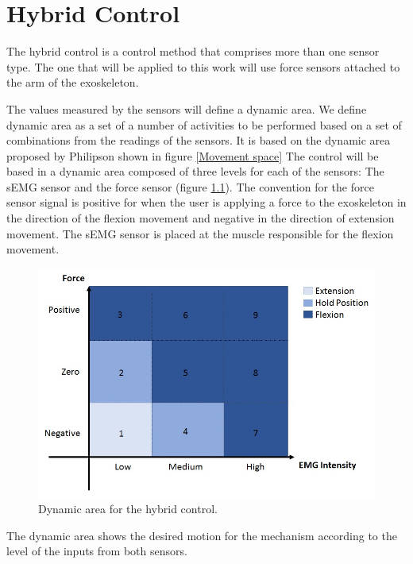 \chapter{Hybrid Control}
\label{ch:Hybrid Control}

The hybrid control is a control method that comprises more than one sensor type. The one that will be applied to this work will use force sensors attached to the arm of the exoskeleton. 

The values measured by the sensors will define a dynamic area. We define dynamic area as a set of a number of activities to be performed based on a set of combinations from the readings of the sensors. It is based on the dynamic area proposed by Philipson \cite{Philipson1985} shown in figure \ref{Movement space}
The control will be based in a dynamic area composed of three levels for each of the sensors: The sEMG sensor and the force sensor (figure \ref{DynamicAreaHybrid}). The convention for the force sensor signal is positive for when the user is applying a force to the exoskeleton in the direction of the flexion movement and negative in the direction of extension movement. The sEMG sensor is placed at the muscle responsible for the flexion movement.

\begin{figure}[thpb]
      \centering
      \includegraphics[scale=0.6]{Images/DynamicAreaHybrid.jpg}
      \caption{Dynamic area for the hybrid control.}
      \label{DynamicAreaHybrid}
   \end{figure}

The dynamic area shows the desired motion for the mechanism according to the level of the inputs from both sensors.


